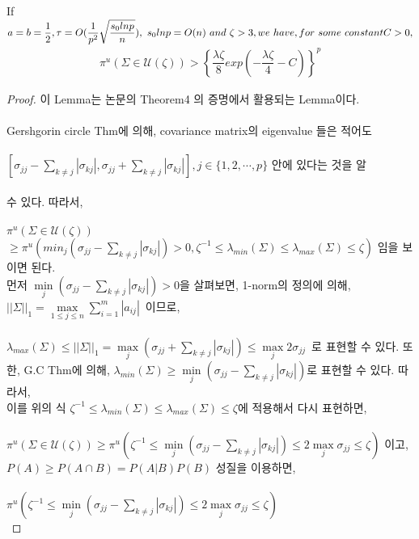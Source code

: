 If $a=b=\dfrac{1}{2},\tau=O(\dfrac{1}{p^2}\sqrt{\dfrac{s_0lnp}{n}}),\ s_0lnp=O(n)\ and\ \zeta >3, we\ have, for\ some\ constant\\ C>0,$ \\
\begin{align*}
    \pi^u(\Sigma \in \mathcal{U}(\zeta))>\left\{\dfrac{\lambda \zeta}{8}exp(-\dfrac{\lambda \zeta}{4}-C) \right\}^p
\end{align*}
\noindent
\begin{proof}
\noindent
이 Lemma는 논문의 Theorem4 의 증명에서 활용되는 Lemma이다.\\
\\
Gershgorin circle Thm에 의해, covariance matrix의 eigenvalue 들은 적어도\\
\\
$[\sigma_{jj}-\sum\limits_{k\neq j}|\sigma_{kj}|,\sigma_{jj}+\sum\limits_{k\neq j}|\sigma_{kj}|], j \in \{1,2,\cdots,p\}$ 안에 있다는 것을 알 \\
\\수 있다. 따라서,\\
\\
$\pi^u(\Sigma \in \mathcal{U}(\zeta))$ 
$\geq \pi^u(min_j(\sigma_{jj}-\sum_{k\neq j}|\sigma_{kj}|)>0,\zeta^{-1} \leq \lambda_{min}(\Sigma)\leq \lambda_{max}(\Sigma)\leq \zeta)$ 임을 보이면 된다.\\
먼저 $\min\limits_{j}(\sigma_{jj}-\sum\limits_{k\neq j}|\sigma_{kj}|)>0$을 살펴보면, 1-norm의 정의에 의해,\\
$||\Sigma||_1 = \max\limits_{1\leq j\leq n} \sum\limits_{i=1}^{m}|a_{ij}|$\ 이므로,\\
\\
$\lambda_{max}(\Sigma) \leq ||\Sigma||_1 = \max\limits_{j}(\sigma_{jj}+\sum\limits_{k\neq j}|\sigma_{kj}|)\leq \max\limits_{j}2\sigma_{jj}$\ 로 표현할 수 있다. 또한, G.C Thm에 의해, $\lambda_{min}(\Sigma)\geq \min\limits_{j}(\sigma_{jj}-\sum\limits_{k\neq j}|\sigma_{kj}|)$로 표현할 수 있다. 따라서,\\
이를 위의 식 $\zeta^{-1} \leq \lambda_{min}(\Sigma)\leq \lambda_{max}(\Sigma)\leq \zeta$에 적용해서 다시 표현하면,\\
\\
$\pi^u(\Sigma \in \mathcal{U}(\zeta)) \geq \pi^u(\zeta^{-1}\leq\min\limits_{j}(\sigma_{jj}-\sum\limits_{k\neq j}|\sigma_{kj}|)\leq 2\max\limits_{j}\sigma_{jj}\leq\zeta)$ 이고, $P(A)\geq P(A \cap B)=P(A|B)P(B)$ 성질을 이용하면,\\
\\
$\pi^u(\zeta^{-1}\leq\min\limits_{j}(\sigma_{jj}-\sum\limits_{k\neq j}|\sigma_{kj}|)\leq 2\max\limits_{j}\sigma_{jj}\leq\zeta)$\\

\end{proof}

